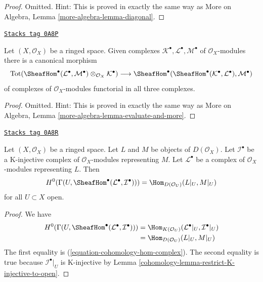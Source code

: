 \begin{proof}
Omitted. Hint: This is proved in exactly the same way as
More on Algebra, Lemma \ref{more-algebra-lemma-diagonal}.
\end{proof}

\begin{lemma}
\label{cohomology-lemma-evaluate-and-more}
\href{https://stacks.math.columbia.edu/tag/0A8P}{\texttt{Stacks tag 0A8P}}

Let $(X, \mathcal{O}_X)$ be a ringed space. Given complexes
$\mathcal{K}^\bullet, \mathcal{L}^\bullet, \mathcal{M}^\bullet$
of $\mathcal{O}_X$-modules there is a canonical morphism
$$
\text{Tot}(\SheafHom^\bullet(\mathcal{L}^\bullet,
\mathcal{M}^\bullet) \otimes_{\mathcal{O}_X} \mathcal{K}^\bullet)
\longrightarrow
\SheafHom^\bullet(\SheafHom^\bullet(\mathcal{K}^\bullet,
\mathcal{L}^\bullet), \mathcal{M}^\bullet)
$$
of complexes of $\mathcal{O}_X$-modules functorial in all three complexes.
\end{lemma}

\begin{proof}
Omitted. Hint: This is proved in exactly the same way as
More on Algebra, Lemma \ref{more-algebra-lemma-evaluate-and-more}.
\end{proof}

\begin{lemma}
\label{cohomology-lemma-RHom-into-K-injective}
\href{https://stacks.math.columbia.edu/tag/0A8R}{\texttt{Stacks tag 0A8R}}

Let $(X, \mathcal{O}_X)$ be a ringed space. Let $L$ and $M$
be objects of $D(\mathcal{O}_X)$. Let $\mathcal{I}^\bullet$
be a K-injective complex of $\mathcal{O}_X$-modules representing $M$. Let
$\mathcal{L}^\bullet$ be a complex of $\mathcal{O}_X$-modules
representing $L$. Then
$$
H^0(\Gamma(U, \SheafHom^\bullet(\mathcal{L}^\bullet, \mathcal{I}^\bullet))) =
\Hom_{D(\mathcal{O}_U)}(L|_U, M|_U)
$$
for all $U \subset X$ open.
\end{lemma}

\begin{proof}

We have
\begin{align*}
H^0(\Gamma(U, \SheafHom^\bullet(\mathcal{L}^\bullet, \mathcal{I}^\bullet)))
& =
\Hom_{K(\mathcal{O}_U)}(\mathcal{L}^\bullet|_U, \mathcal{I}^\bullet|_U) \\
& =
\Hom_{D(\mathcal{O}_U)}(L|_U, M|_U)
\end{align*}
The first equality is (\ref{equation-cohomology-hom-complex}).
The second equality is true because $\mathcal{I}^\bullet|_U$
is K-injective by Lemma \ref{cohomology-lemma-restrict-K-injective-to-open}.
\end{proof}

